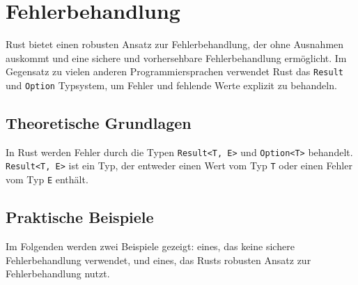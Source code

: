 \chapter{Fehlerbehandlung}
Rust bietet einen robusten Ansatz zur Fehlerbehandlung, der ohne Ausnahmen auskommt und eine sichere und vorhersehbare Fehlerbehandlung ermöglicht. 
Im Gegensatz zu vielen anderen Programmiersprachen verwendet Rust das \texttt{Result} und \texttt{Option} Typsystem, um Fehler und fehlende Werte explizit zu behandeln.

\section{Theoretische Grundlagen}
In Rust werden Fehler durch die Typen \texttt{Result<T, E>} und \texttt{Option<T>} behandelt. 
\texttt{Result<T, E>} ist ein Typ, der entweder einen Wert vom Typ \texttt{T} oder einen Fehler vom Typ \texttt{E} enthält. 

\section{Praktische Beispiele}
Im Folgenden werden zwei Beispiele gezeigt: eines, das keine sichere Fehlerbehandlung verwendet, und eines, das Rusts robusten Ansatz zur Fehlerbehandlung nutzt.

